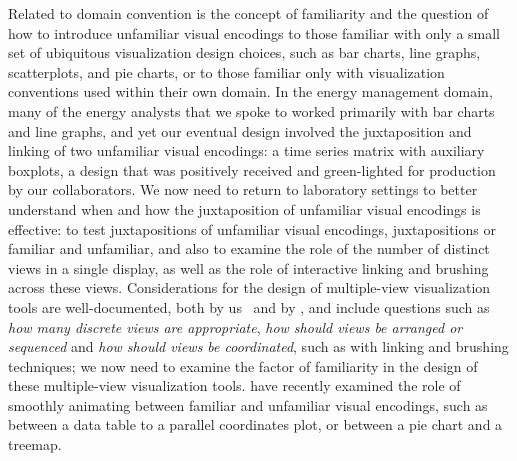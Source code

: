 Related to domain convention is the concept of familiarity and the question of how to introduce unfamiliar visual encodings to those familiar with only a small set of ubiquitous visualization design choices, such as bar charts, line graphs, scatterplots, and pie charts, or to those familiar only with visualization conventions used within their own domain.
In the energy management domain, many of the energy analysts that we spoke to worked primarily with bar charts and line graphs, and yet our eventual design involved the juxtaposition and linking of two unfamiliar visual encodings: a time series matrix with auxiliary boxplots, a design that was positively received and green-lighted for production by our collaborators.
We now need to return to laboratory settings to better understand when and how the juxtaposition of unfamiliar visual encodings is effective: to test juxtapositions of unfamiliar visual encodings, juxtapositions or familiar and unfamiliar, and also to examine the role of the number of distinct views in a single display, as well as the role of interactive linking and brushing across these views.
Considerations for the design of multiple-view visualization tools are well-documented, both by us~\cite{Lam2010} and by \citet{Weaver2007}, and include questions such as {\it how many discrete views are appropriate}, {\it how should views be arranged or sequenced} and {\it how should views be coordinated}, such as with linking and brushing techniques; we now need to examine the factor of familiarity in the design of these multiple-view visualization tools.
\citet{Ruchikachorn2015} have recently examined the role of smoothly animating between familiar and unfamiliar visual encodings, such as between a data table to a parallel coordinates plot, or between a pie chart and a treemap.
